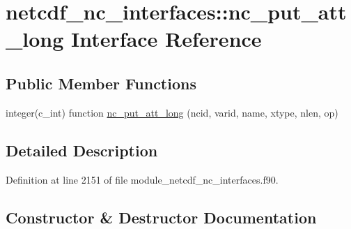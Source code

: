 \hypertarget{interfacenetcdf__nc__interfaces_1_1nc__put__att__long}{}\section{netcdf\+\_\+nc\+\_\+interfaces\+:\+:nc\+\_\+put\+\_\+att\+\_\+long Interface Reference}
\label{interfacenetcdf__nc__interfaces_1_1nc__put__att__long}
\subsection*{Public Member Functions}
\begin{DoxyCompactItemize}
\item 
integer(c\+\_\+int) function \hyperlink{interfacenetcdf__nc__interfaces_1_1nc__put__att__long_ad2b97e9f77c0a67a61310b5d06d4726c}{nc\+\_\+put\+\_\+att\+\_\+long} (ncid, varid, name, xtype, nlen, op)
\end{DoxyCompactItemize}


\subsection{Detailed Description}


Definition at line 2151 of file module\+\_\+netcdf\+\_\+nc\+\_\+interfaces.\+f90.



\subsection{Constructor \& Destructor Documentation}
\mbox{\label{interfacenetcdf__nc__interfaces_1_1nc__put__att__long_ad2b97e9f77c0a67a61310b5d06d4726c}} 
